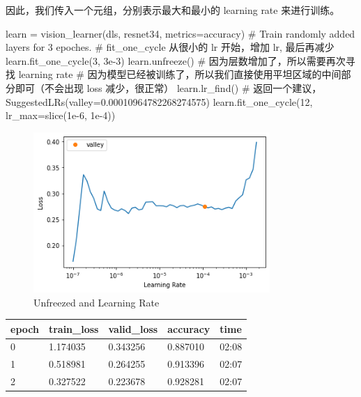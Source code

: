 \documentclass{ctexart}
\newenvironment{monos}{\VerbatimEnvironment\begin{pythoncode}}{\end{pythoncode}}
\begin{document}
因此，我们传入一个元组，分别表示最大和最小的 learning rate 来进行训练。

\begin{monos}
learn = vision_learner(dls, resnet34, metrics=accuracy)
# Train randomly added layers for 3 epoches.
# fit_one_cycle 从很小的 lr 开始，增加 lr, 最后再减少
learn.fit_one_cycle(3, 3e-3)
learn.unfreeze()
# 因为层数增加了，所以需要再次寻找 learning rate
# 因为模型已经被训练了，所以我们直接使用平坦区域的中间部分即可（不会出现 loss 减少，很正常）
learn.lr_find()
# 返回一个建议，SuggestedLRs(valley=0.00010964782268274575)
learn.fit_one_cycle(12, lr_max=slice(1e-6, 1e-4))
\end{monos}

\begin{figure}[H]
    \centering
    \includegraphics[width=0.8\textwidth]{assets/lr_unfreeze.png}
    \caption{Unfreezed and Learning Rate}
    \label{fig:lr_unfreeze}
\end{figure}


\begin{longtable}[]{@{}lllll@{}}
    \toprule()
    epoch & train\_loss & valid\_loss & accuracy & time  \\
    \midrule()
    \endhead
    0     & 1.174035    & 0.343256    & 0.887010 & 02:08 \\
    1     & 0.518981    & 0.264255    & 0.913396 & 02:07 \\
    2     & 0.327522    & 0.223678    & 0.928281 & 02:07 \\
    \bottomrule()
\end{longtable}
\end{document}
